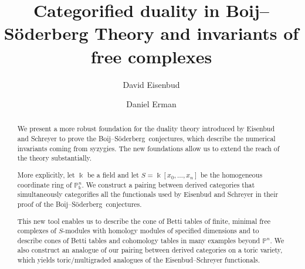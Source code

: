 \documentclass[12pt]{amsart}
\title{Categorified duality in Boij--S\"oderberg Theory and invariants of free complexes}
\author{David Eisenbud}
\author{Daniel Erman}
\theoremstyle{definition}
\theoremstyle{remark}
\newcommand{\kk}{\Bbbk}
\newcommand{\PP}{\mathbb{P}}
\def\BS{Boij--S\"oderberg~}
\begin{document}
\begin{abstract} We present a more robust foundation for the duality theory introduced by Eisenbud and Schreyer to prove the \BS conjectures, which describe the numerical invariants coming from syzygies.
The new foundations allow us to extend the reach of the theory substantially.

More explicitly, let $\kk$ be a field and let $S = \kk[x_{0}, \dots,x_{n}]$ be the homogeneous coordinate ring of $\PP^{n}_{\kk}$.
We construct a pairing between derived categories that
simultaneously categorifies all the functionals used by Eisenbud and Schreyer in their proof of the \BS conjectures.

This new tool enables us to describe the cone of Betti tables of finite, minimal free complexes of $S$-modules with homology modules of specified dimensions and  to describe cones of Betti tables and cohomology tables in many examples beyond $\PP^n$. We also construct an analogue of our pairing between derived categories on a toric variety, which yields toric/multigraded analogues of the Eisenbud--Schreyer functionals.
\end{abstract}

\maketitle

\tableofcontents


\end{document}
